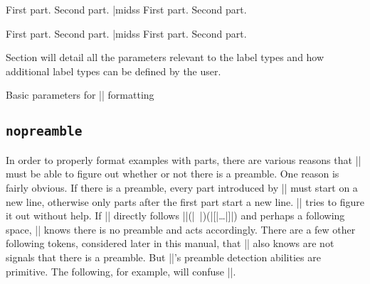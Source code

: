 \beginss
\pex[labeltype=caps]
\a First part.
\a Second part.
\xe |midss
\pex[labeltype=caps]
\a First part.
\a Second part.
\xe
\endss

\beginss
\pex[labeltype=numeric]
\a First part.
\a Second part.
\xe |midss
\pex[labeltype=numeric]
\a First part.
\a Second part.
\xe
\endss

Section  will detail all the parameters relevant
to the label types and how additional label types can be defined
by the user.

\ex Basic parameters for |\pex| formatting\smallskip
\leftskip=0pt
\hfil{}\xe

\subsection {\tt nopreamble}

In order to properly format examples with parts, there are
various reasons that |\pex| must be able to figure out whether
or not there is a preamble.  One reason is fairly obvious.  If
there is a preamble, every part introduced by |\a| must start on
a new line, otherwise only parts after the first part start a new
line.  |\pex| tries to figure it out without help.  If |\a|
directly follows |\pex|(|~|)(|[|\dots|]|) and perhaps a following
space, |\pex| knows there is no preamble and acts accordingly.
There are a few other following tokens, considered later in this
manual, that |\pex| also knows are not signals that there is a
preamble.  But |\pex|'s preamble detection abilities are
primitive.  The following, for example, will confuse |\pex|.


